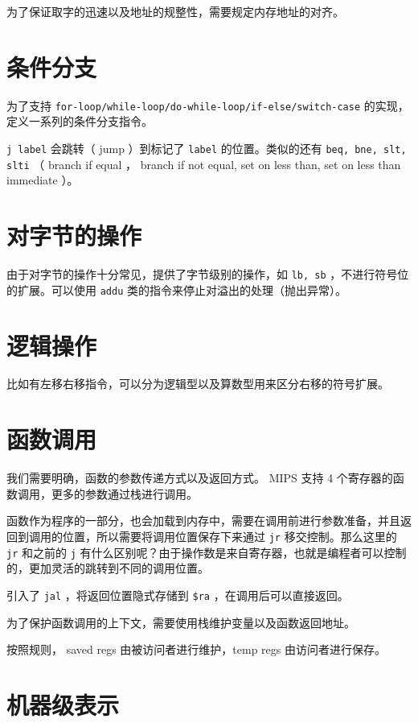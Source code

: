 \documentclass[cn,11pt,chinese,black,simple]{../elegantbook}
\begin{document}
为了保证取字的迅速以及地址的规整性，需要规定内存地址的对齐。

\section{条件分支}

为了支持 \lstinline{for-loop/while-loop/do-while-loop/if-else/switch-case} 的实现，定义一系列的条件分支指令。

\lstinline{j label} 会跳转（ jump ）到标记了 \lstinline{label} 的位置。类似的还有 \lstinline{beq, bne, slt, slti} （ branch if equal ， branch if not equal, set on less than, set on less than immediate ）。

\section{对字节的操作}

由于对字节的操作十分常见，提供了字节级别的操作，如 \lstinline{lb, sb} ，不进行符号位的扩展。可以使用 \lstinline{addu} 类的指令来停止对溢出的处理（抛出异常）。

\section{逻辑操作}

比如有左移右移指令，可以分为逻辑型以及算数型用来区分右移的符号扩展。

\section{函数调用}

我们需要明确，函数的参数传递方式以及返回方式。 MIPS 支持 4 个寄存器的函数调用，更多的参数通过栈进行调用。

函数作为程序的一部分，也会加载到内存中，需要在调用前进行参数准备，并且返回到调用的位置，所以需要将调用位置保存下来通过 \lstinline{jr} 移交控制。那么这里的 \lstinline{jr} 和之前的 \lstinline{j} 有什么区别呢？由于操作数是来自寄存器，也就是编程者可以控制的，更加灵活的跳转到不同的调用位置。

引入了 \lstinline{jal} ，将返回位置隐式存储到 \lstinline{$ra} ，在调用后可以直接返回。

为了保护函数调用的上下文，需要使用栈维护变量以及函数返回地址。

按照规则， saved regs 由被访问者进行维护，temp regs 由访问者进行保存。

\section{机器级表示}
\end{document}
